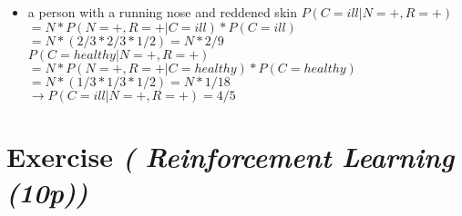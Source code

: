 \documentclass{article}
\begin{document}
\begin{enumerate}
\begin{itemize}
    \item a person with a running nose and reddened skin
        $P(C = ill | N = + , R = +) $ \\ $= N * P (N = + , R = + | C = ill)*P(C = ill)$ \\ $= N*(2/3 * 2/3 * 1/2) = N*2/9$ \\
        $P(C = healthy | N = + , R = +) $ \\ $= N * P (N = + , R = + | C = healthy)*P(C = healthy)$ \\ $= N*(1/3 * 1/3 * 1/2) = N *1/18$\\
        $\to P(C = ill | N = + , R = +) = 4/5$
    \end{itemize}

\end{enumerate}
\section{Exercise \textit{( Reinforcement Learning (10p))}}
\end{document}
